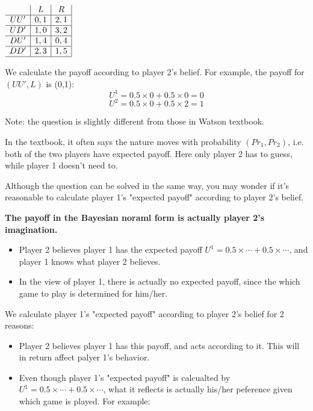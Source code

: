 \documentclass{article}
\begin{document}
\begin{center}
$
\begin{array}{c|c|c|}
 & L & R \\
\hline
UU' & 0,1 & 2,1 \\
\hline
UD' & 1,0 & 3,2 \\
\hline
DU' & 1,4 & 0,4 \\
\hline
DD' & 2,3 & 1,5 \\
\hline
\end{array}
$
\end{center}
%

\begin{mdframed}[backgroundcolor=blue!20,linecolor=white]

We calculate the payoff according to player 2's belief. For example, the 
payoff for $(UU',L)$ is (0,1):
$$U^1= 0.5 \times 0 +  0.5 \times 0 =0$$
$$U^2= 0.5 \times 0 +  0.5 \times 2 =1$$


Note: the question is slightly different from those in Watson textbook.
\medskip

In the textbook, it often says
the nature moves with probability $(Pr_1,Pr_2)$, i.e. both of the two players have expected payoff.
Here only player 2 has to guess, while player 1 doesn't need to. 
\medskip

Although the question can be solved in the same way, you may wonder if it's reasonable to calculate player 1's "expected payoff" according to player 2's belief.

\medskip

\textbf{The payoff in the Bayesian noraml form is actually player 2's imagination.}

\begin{itemize}
\item Player 2 believes player 1 has the expected payoff $U^1 = 0.5 \times \cdots + 0.5 \times \cdots$, and player 1 knows what player 2 believes.
\item In the view of player 1, there is actually no expected payoff, since the which game to play is determined for him/her.
\end{itemize}


We calculate player 1's "expected payoff" according to player 2's belief for 2 reasons:

\begin{itemize}
\item Player 2 believes player 1 has this payoff, and acts according to it. This will in return affect palyer 1's behavior.
\item Even though player 1's "expected payoff" is calcualted by $U^1 = 0.5 \times \cdots + 0.5 \times \cdots$, what it reflects is actually his/her peference given which game is played. For example:


\end{itemize}
\end{mdframed}
\end{document}
